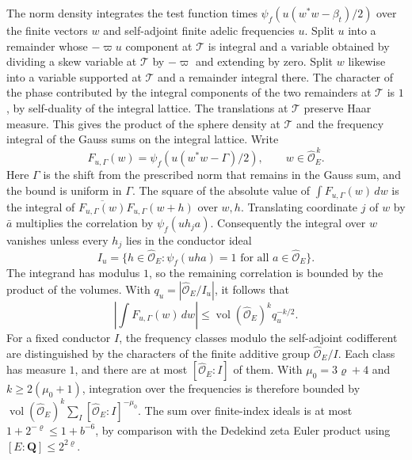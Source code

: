 The norm density integrates the test function times
\(\psi_f(u(w^*w-\beta_t)/2)\) over the finite vectors \(w\) and
self-adjoint finite adelic frequencies \(u\). Split \(u\) into a remainder whose \(-\varpi u\) component at
\(\mathcal T\) is integral and a variable obtained by dividing a skew
variable at \(\mathcal T\) by \(-\varpi\) and extending by zero. Split \(w\) likewise into a variable supported at
\(\mathcal T\) and a remainder integral there.
The character of the phase contributed by the integral components of
the two remainders at \(\mathcal T\) is \(1\), by self-duality of the
integral lattice. The translations at \(\mathcal T\) preserve Haar
measure. This gives the product of the sphere density at \(\mathcal T\)
and the frequency integral of the Gauss sums on the integral lattice.
Write
\[
 F_{u,\Gamma}(w)=\psi_f\!\left(u(w^*w-\Gamma)/2\right),
 \qquad w\in\widehat{\mathcal O}_E^{\,k}.
\]
Here \(\Gamma\) is the shift from the prescribed norm that remains in
the Gauss sum, and the bound is uniform in \(\Gamma\).
The square of the absolute value of \(\int F_{u,\Gamma}(w)\,dw\)
is the integral of \(\overline{F_{u,\Gamma}(w)}F_{u,\Gamma}(w+h)\)
over \(w,h\). Translating coordinate \(j\) of \(w\) by \(\bar a\)
multiplies the correlation by \(\psi_f(u h_j a)\).
Consequently the integral over \(w\) vanishes unless every \(h_j\)
lies in the conductor ideal
\[
 I_u=\{h\in\widehat{\mathcal O}_E:
            \psi_f(uha)=1\text{ for all }a\in\widehat{\mathcal O}_E\}.
\]
The integrand has modulus \(1\), so the remaining correlation is
bounded by the product of the volumes. With
\(q_u=|\widehat{\mathcal O}_E/I_u|\), it follows that
\[
 \left|\int F_{u,\Gamma}(w)\,dw\right|
 \le \operatorname{vol}(\widehat{\mathcal O}_E)^k q_u^{-k/2}.
\]
For a fixed conductor \(I\), the frequency classes modulo the
self-adjoint codifferent are distinguished by the characters of
the finite additive group \(\widehat{\mathcal O}_E/I\). Each class has
measure \(1\), and there are at most \([\widehat{\mathcal O}_E:I]\) of them.
With \(\mu_0=3\varrho+4\) and \(k\ge2(\mu_0+1)\), integration over the
frequencies is therefore bounded by
\(\operatorname{vol}(\widehat{\mathcal O}_E)^k
\sum_I[\widehat{\mathcal O}_E:I]^{-\mu_0}\).
The sum over finite-index ideals is at most
\(1+2^{-\varrho}\le1+b^{-6}\), by comparison with the Dedekind zeta
Euler product using \([E:\mathbf Q]\le2^{2\varrho}\).

